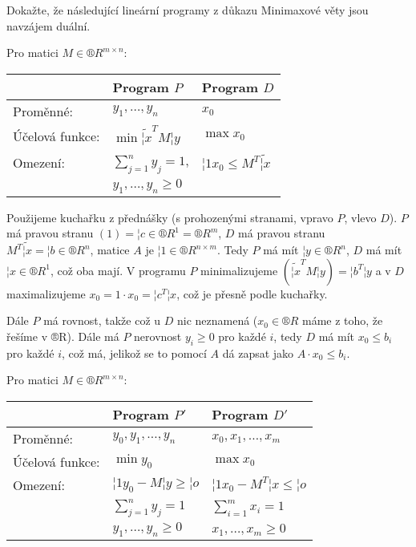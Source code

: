 \documentclass[12pt]{article}					%
\begin{document}
\begin{priklad}[2.1]
	Dokažte, že následující lineární programy z důkazu Minimaxové věty jsou navzájem duální.

	Pro matici $M \in ®R^{m \times n}$:\\[-2em]
	\begin{center}
		\begin{tabular}{l|l|l}
			                & Program $P$             & Program $D$      \\ \hline
			Proměnné:       & $y_1, …, y_n$           & $x_0$            \\
			Účelová funkce: & $\min \tilde{¦x}^T M ¦y$          & $\max x_0$       \\
			Omezení:        & $\sum_{j=1}^n y_j = 1$, & $¦1 x_0 ≤ M^T \tilde{¦x}$ \\
			                & $y_1, …, y_n ≥ 0$       &
		\end{tabular}
	\end{center}

	\begin{dukazin}
		Použijeme kuchařku z přednášky (s prohozenými stranami, vpravo $P$, vlevo $D$). $P$ má pravou stranu $(1) = ¦c \in ®R^1 = ®R^m$, $D$ má pravou stranu $M^T\tilde{¦x} = ¦b \in ®R^n$, matice $A$ je $¦1 \in ®R^{n \times m}$. Tedy $P$ má mít $¦y \in ®R^n$, $D$ má mít $¦x \in ®R^1$, což oba mají. V programu $P$ minimalizujeme $(\tilde{¦x}^T M ¦y) = ¦b^T¦y$ a v $D$ maximalizujeme $x_0 = 1·x_0 = ¦c^T ¦x$, což je přesně podle kuchařky.

		Dále $P$ má rovnost, takže což u $D$ nic neznamená ($x_0 \in ®R$ máme z toho, že řešíme v ®R). Dále má $P$ nerovnost $y_i ≥ 0$ pro každé $i$, tedy $D$ má mít $x_0 ≤ b_i$ pro každé $i$, což má, jelikož se to pomocí $A$ dá zapsat jako $A·x_0 ≤ b_i$.
	\end{dukazin}

	Pro matici $M \in ®R^{m \times n}$:\\[-2em]
	\begin{center}
		\begin{tabular}{l|l|l}
		                & Program $P'$           & Program $D'$           \\ \hline
		Proměnné:       & $y_0, y_1, …, y_n$     & $x_0, x_1, …, x_m$     \\
		Účelová funkce: & $\min y_0$             & $\max x_0$             \\
		Omezení:        & $¦1 y_0 - M¦y ≥ ¦o$    & $¦1 x_0 - M^T ¦x ≤ ¦o$ \\
		                & $\sum_{j=1}^n y_j = 1$ & $\sum_{i=1}^m x_i = 1$ \\
		                & $y_1, …, y_n ≥ 0$      & $x_1, …, x_m ≥ 0$
		\end{tabular}
	\end{center}


\end{priklad}
\end{document}
